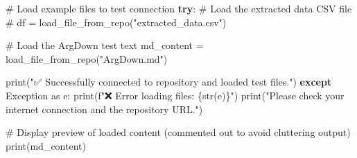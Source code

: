 \documentclass[
  11pt,
  letterpaper,
]{book}
\newenvironment{Shaded}{\begin{snugshade}}{\end{snugshade}}
\newcommand{\BuiltInTok}[1]{\textcolor[rgb]{0.00,0.23,0.31}{#1}}
\newcommand{\CommentTok}[1]{\textcolor[rgb]{0.37,0.37,0.37}{#1}}
\newcommand{\ControlFlowTok}[1]{\textcolor[rgb]{0.00,0.23,0.31}{\textbf{#1}}}
\newcommand{\ImportTok}[1]{\textcolor[rgb]{0.00,0.46,0.62}{#1}}
\newcommand{\NormalTok}[1]{\textcolor[rgb]{0.00,0.23,0.31}{#1}}
\newcommand{\OperatorTok}[1]{\textcolor[rgb]{0.37,0.37,0.37}{#1}}
\newcommand{\PreprocessorTok}[1]{\textcolor[rgb]{0.68,0.00,0.00}{#1}}
\newcommand{\SpecialCharTok}[1]{\textcolor[rgb]{0.37,0.37,0.37}{#1}}
\newcommand{\SpecialStringTok}[1]{\textcolor[rgb]{0.13,0.47,0.30}{#1}}
\newcommand{\StringTok}[1]{\textcolor[rgb]{0.13,0.47,0.30}{#1}}
\begin{document}
\begin{Shaded}
\begin{Highlighting}[]
\CommentTok{\# Load example files to test connection}
\ControlFlowTok{try}\NormalTok{:}
    \CommentTok{\# Load the extracted data CSV file}
\CommentTok{\#    df = load\_file\_from\_repo("extracted\_data.csv")}

    \CommentTok{\# Load the ArgDown test text}
\NormalTok{    md\_content }\OperatorTok{=}\NormalTok{ load\_file\_from\_repo(}\StringTok{"ArgDown.md"}\NormalTok{)}

    \BuiltInTok{print}\NormalTok{(}\StringTok{"✅ Successfully connected to repository and loaded test files."}\NormalTok{)}
\ControlFlowTok{except} \PreprocessorTok{Exception} \ImportTok{as}\NormalTok{ e:}
    \BuiltInTok{print}\NormalTok{(}\SpecialStringTok{f"❌ Error loading files: }\SpecialCharTok{\{}\BuiltInTok{str}\NormalTok{(e)}\SpecialCharTok{\}}\SpecialStringTok{"}\NormalTok{)}
    \BuiltInTok{print}\NormalTok{(}\StringTok{"Please check your internet connection and the repository URL."}\NormalTok{)}

\CommentTok{\# Display preview of loaded content (commented out to avoid cluttering output)}
\BuiltInTok{print}\NormalTok{(md\_content)}
\end{Highlighting}
\end{Shaded}
\end{document}
